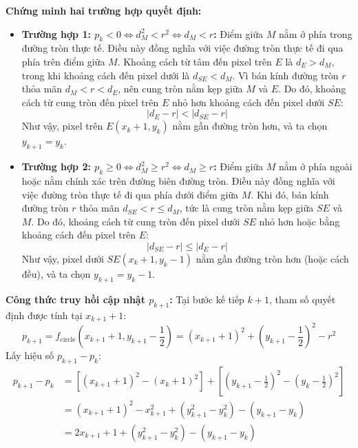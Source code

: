 \textbf{Chứng minh hai trường hợp quyết định:}
\begin{itemize}
    \item \textbf{Trường hợp 1: $p_k < 0 \iff d_M^2 < r^2 \iff d_M < r$:}
    Điểm giữa $M$ nằm ở phía trong đường tròn thực tế. Điều này đồng nghĩa với việc đường tròn thực tế đi qua phía trên điểm giữa $M$. Khoảng cách từ tâm đến pixel trên $E$ là $d_E > d_M$, trong khi khoảng cách đến pixel dưới là $d_{SE} < d_M$. Vì bán kính đường tròn $r$ thỏa mãn $d_M < r < d_E$, nên cung tròn nằm kẹp giữa $M$ và $E$. Do đó, khoảng cách từ cung tròn đến pixel trên $E$ nhỏ hơn khoảng cách đến pixel dưới $SE$:
    \begin{equation}
    |d_E - r| < |d_{SE} - r|
    \end{equation}
    Như vậy, pixel trên $E(x_k + 1, y_k)$ nằm gần đường tròn hơn, và ta chọn $y_{k+1} = y_k$.
    
    \item \textbf{Trường hợp 2: $p_k \ge 0 \iff d_M^2 \ge r^2 \iff d_M \ge r$:}
    Điểm giữa $M$ nằm ở phía ngoài hoặc nằm chính xác trên đường biên đường tròn. Điều này đồng nghĩa với việc đường tròn thực tế đi qua phía dưới điểm giữa $M$. Khi đó, bán kính đường tròn $r$ thỏa mãn $d_{SE} < r \le d_M$, tức là cung tròn nằm kẹp giữa $SE$ và $M$. Do đó, khoảng cách từ cung tròn đến pixel dưới $SE$ nhỏ hơn hoặc bằng khoảng cách đến pixel trên $E$:
    \begin{equation}
    |d_{SE} - r| \le |d_E - r|
    \end{equation}
    Như vậy, pixel dưới $SE(x_k + 1, y_k - 1)$ nằm gần đường tròn hơn (hoặc cách đều), và ta chọn $y_{k+1} = y_k - 1$.
\end{itemize}

\textbf{Công thức truy hồi cập nhật $p_{k+1}$:}
Tại bước kế tiếp $k+1$, tham số quyết định được tính tại $x_{k+1} + 1$:
\begin{equation}
p_{k+1} = f_{\text{circle}}\left( x_{k+1} + 1, y_{k+1} - \frac{1}{2} \right) = (x_{k+1} + 1)^2 + \left( y_{k+1} - \frac{1}{2} \right)^2 - r^2
\end{equation}
Lấy hiệu số $p_{k+1} - p_k$:
\begin{align}
p_{k+1} - p_k &= \left[ (x_{k+1} + 1)^2 - (x_k + 1)^2 \right] + \left[ \left( y_{k+1} - \frac{1}{2} \right)^2 - \left( y_k - \frac{1}{2} \right)^2 \right] \nonumber \\
&= (x_{k+1} + 1)^2 - x_{k+1}^2 + (y_{k+1}^2 - y_k^2) - (y_{k+1} - y_k) \nonumber \\
&= 2x_{k+1} + 1 + (y_{k+1}^2 - y_k^2) - (y_{k+1} - y_k)
\end{align}

